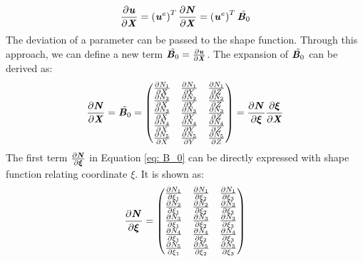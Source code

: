 \begin{equation}
\frac{\partial \textbf{\textit{u}}}{\partial \textbf{\textit{X}}} = \left(\textbf{\textit{u}}^e\right)^T \frac{\partial \textbf{\textit{N}}}{\partial \textbf{\textit{X}}} = \left(\textbf{\textit{u}}^e\right)^T \tilde{\textbf{\textit{B}}_0}
\end{equation}
The deviation of a parameter can be passed to the shape function. Through this approach, we can define a new term $\tilde{\textbf{\textit{B}}_0} = \frac{\partial \textbf{\textit{u}}}{\partial \textbf{\textit{X}}}$. The expansion of $\tilde{\textbf{\textit{B}}_0}$ can be derived as:
\begin{equation} \label{eq: B_0}
\frac{\partial \textbf{\textit{N}}}{\partial \textbf{\textit{X}}} = \tilde{\textbf{\textit{B}}_0} = \begin{pmatrix}
\frac{\partial N_1}{\partial X} & \frac{\partial N_1}{\partial Y} & \frac{\partial N_1}{\partial Z} \\
\frac{\partial N_2}{\partial X} & \frac{\partial N_2}{\partial Y} & \frac{\partial N_2}{\partial Z} \\
\frac{\partial N_3}{\partial X} & \frac{\partial N_3}{\partial Y} & \frac{\partial N_3}{\partial Z} \\
\frac{\partial N_4}{\partial X} & \frac{\partial N_4}{\partial Y} & \frac{\partial N_4}{\partial Z} \\
\frac{\partial N_5}{\partial X} & \frac{\partial N_5}{\partial Y} & \frac{\partial N_5}{\partial Z} \\
\end{pmatrix} = \frac{\partial \textbf{\textit{N}}}{\partial \boldsymbol{\xi}} \frac{\partial \boldsymbol{\xi}}{\partial \textbf{\textit{X}}}
\end{equation}
The first term $\frac{\partial \textbf{\textit{N}}}{\partial \boldsymbol{\xi}}$ in Equation \ref{eq: B_0} can be directly expressed with shape function relating coordinate $\xi$. It is shown as:
\begin{equation}
\frac{\partial \textbf{\textit{N}}}{\partial \boldsymbol{\xi}} = \begin{pmatrix}
\frac{\partial N_1}{\partial \xi_1} & \frac{\partial N_1}{\partial \xi_2} & \frac{\partial N_1}{\partial \xi_3} \\
\frac{\partial N_2}{\partial \xi_1} & \frac{\partial N_2}{\partial
	\xi_2} & \frac{\partial N_2}{\partial \xi_3} \\
\frac{\partial N_3}{\partial \xi_1} & \frac{\partial N_3}{\partial \xi_2} & \frac{\partial N_3}{\partial \xi_3} \\
\frac{\partial N_4}{\partial \xi_1} & \frac{\partial N_4}{\partial \xi_2} & \frac{\partial N_4}{\partial \xi_3} \\
\frac{\partial N_5}{\partial \xi_1} & \frac{\partial N_5}{\partial \xi_2} & \frac{\partial N_5}{\partial \xi_3} \\
\end{pmatrix}
\end{equation}
